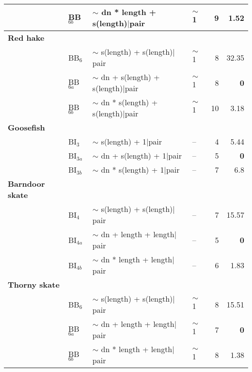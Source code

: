 \begin{center}
\begin{tabular}{llllrr}
   ~~&   BB$_{6b}$&   $\sim$ dn * length + s(length)$|$pair&   $\sim$ 1&    9&   1.52\tabularnewline
\hline
{\bfseries Red hake}&&&&&\tabularnewline
   ~~&   BB$_{6}$&   $\sim$ s(length) + s(length)$|$pair&   $\sim$ 1&    8&   32.35\tabularnewline
   ~~&   BB$_{6a}$&   $\sim$ dn + s(length) + s(length)$|$pair&   $\sim$ 1&    8&\bfseries   0\tabularnewline
   ~~&   BB$_{6b}$&   $\sim$ dn * s(length) + s(length)$|$pair&   $\sim$ 1&   10&   3.18\tabularnewline
\hline
{\bfseries Goosefish}&&&&&\tabularnewline
   ~~&   BI$_{3}$&   $\sim$ s(length) + 1$|$pair&   --&    4&   5.44\tabularnewline
   ~~&   BI$_{3a}$&   $\sim$ dn + s(length) + 1$|$pair&   --&    5&\bfseries   0\tabularnewline
   ~~&   BI$_{3b}$&   $\sim$ dn * s(length) + 1$|$pair&   --&    7&   6.8\tabularnewline
\hline
{\bfseries Barndoor skate}&&&&&\tabularnewline
   ~~&   BI$_{4}$&   $\sim$ s(length) + s(length)$|$pair&   --&    7&   15.57\tabularnewline
   ~~&   BI$_{4a}$&   $\sim$ dn + length + length$|$pair&   --&    5&\bfseries   0\tabularnewline
   ~~&   BI$_{4b}$&   $\sim$ dn * length + length$|$pair&   --&    6&   1.83\tabularnewline
\hline
{\bfseries Thorny skate}&&&&&\tabularnewline
   ~~&   BB$_{6}$&   $\sim$ s(length) + s(length)$|$pair&   $\sim$ 1&    8&   15.51\tabularnewline
   ~~&   BB$_{6a}$&   $\sim$ dn + length + length$|$pair&   $\sim$ 1&    7&\bfseries   0\tabularnewline
   ~~&   BB$_{6b}$&   $\sim$ dn * length + length$|$pair&   $\sim$ 1&    8&   1.38\tabularnewline
\hline
\end{tabular}\end{center}
